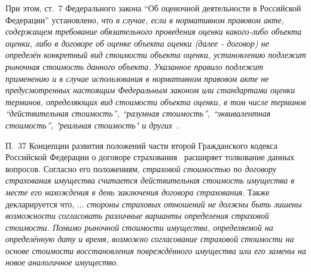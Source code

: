 \documentclass[12pt]{scrartcl}
\begin{document}
При этом, ст.~7 Федерального закона ``Об оценочной деятельности в Российской Федерации'' установлено, что \emph{в случае, если в нормативном правовом акте, содержащем требование обязательного проведения оценки какого-либо объекта оценки, либо в договоре об оценке объекта оценки (далее - договор) не определён конкретный вид стоимости объекта оценки, установлению подлежит рыночная стоимость данного объекта. Указанное правило подлежит применению и в случае использования в нормативном правовом акте не предусмотренных настоящим Федеральным законом или стандартами оценки терминов, определяющих вид стоимости объекта оценки, в том числе терминов ``действительная стоимость'', ``разумная стоимость'', ``эквивалентная стоимость'', "реальная стоимость" и других}~\cite{135-FZ}.

П.~37 Концепции развития положений части второй Гражданского кодекса Российской Федерации о договоре страхования~\cite{InsConcept} расширяет толкование данных вопросов. Согласно его положениям, \emph{страховой стоимостью по договору страхования имущества считается действительная стоимость имущества в месте его нахождения в день заключения договора страхования}. Также декларируется что, $\ldots$ \emph{стороны страховых отношений не должны быть лишены возможности согласовать различные варианты определения страховой стоимости. Помимо рыночной стоимости имущества, определяемой на определённую дату и время, возможно согласование страховой стоимости на основе стоимости восстановления повреждённого имущества или его замены на новое аналогичное имущество}.
\end{document}
